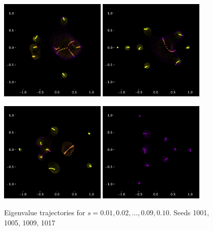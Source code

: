 \documentclass{article}
\begin{document}
	\begin{figure}[htbp]
		\centering
		\includegraphics[width=0.45\textwidth]{figures/initial_frame1001.pdf}
		\includegraphics[width=0.45\textwidth]{figures/initial_frame1005.pdf}

		\includegraphics[width=0.45\textwidth]{figures/initial_frame1009.pdf}
		\includegraphics[width=0.45\textwidth]{figures/initial_frame1017.pdf}
		\caption{Eigenvalue trajectories for $s= 0.01, 0.02, \dots , 0.09, 0.10$. Seeds 1001, 1005, 1009, 1017}
		\label{fig:pdf_image}
	\end{figure}
\end{document}
